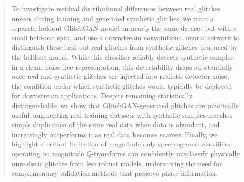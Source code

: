 \documentclass[reprint,nofootinbib,amsmath,amssymb,aps,floatfix]{revtex4-2}
\begin{document}
\begin{abstract}
To investigate residual distributional differences between real glitches unseen during training and generated synthetic glitches, we train a separate holdout GlitchGAN model on nearly the same dataset but with a small held-out split, and use a downstream convolutional neural network to distinguish these held-out real glitches from synthetic glitches produced by the holdout model.
While this classifier reliably detects synthetic samples in a clean, noise-free representation, this detectability drops substantially once real and synthetic glitches are injected into realistic detector noise, the condition under which synthetic glitches would typically be deployed for downstream applications.
Despite remaining statistically distinguishable, we show that GlitchGAN-generated glitches are practically useful: augmenting real training datasets with synthetic samples matches simple duplication of the same real data when data is abundant, and increasingly outperforms it as real data becomes scarcer.
Finally, we highlight a critical limitation of magnitude-only spectrograms: classifiers operating on magnitude $Q$-transforms can confidently misclassify physically unrealistic glitches from less robust models, underscoring the need for complementary validation methods that preserve phase information.
\end{abstract}

\maketitle

\end{document}
